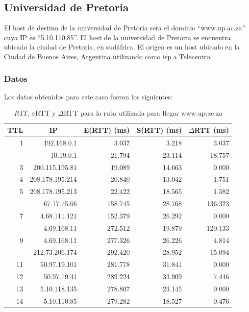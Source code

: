 \subsection{Universidad de Pretoria}
El host de destino de la universidad de Pretoria sera el dominio ``www.up.ac.za'' cuya IP es ``5.10.110.85''. El host de la universidad de Pretoria se encuentra ubicado la ciudad de Pretoria, en sudáfrica. El origen es un host ubicado en la Ciudad de Buenos Aires, Argentina utilizando como isp a Telecentro.

\subsubsection{Datos}

Los datos obtenidos para este caso fueron los siguientes:

\begin{table}[H]
    \begin{center}
        \begin{tabular}{| r | r | r | r | r |}
  \hline
  {\bf TTL} & \multicolumn{1}{|c|}{\bf IP} & {\bf E(RTT) (ms)} & {\bf S(RTT) (ms)} & {\bf $\Delta$RTT (ms)}\\
  \hline 
\hline 1  & 192.168.0.1 &  3.037 & 3.218 & 3.037\\
\rowcolor{blue!25}\hline 2  & 10.19.0.1 & 21.794 & 23.114 & 18.757\\
\hline 3  & 200.115.195.81 & 19.089 & 14.663 & 0.000\\
\hline 4  & 208.178.195.214 & 20.840 & 13.042 & 1.751\\ 
\hline 5  & 208.178.195.213 & 22.422 & 18.565 & 1.582\\ 
\rowcolor{blue!25}\hline 6  & 67.17.75.66 & 158.745 & 28.768 & 136.323\\ 
\hline 7  & 4.68.111.121 &  152.379 & 26.292 & 0.000\\ 
\rowcolor{blue!25}\hline 8  & 4.69.168.11 & 272.512 & 19.879 & 120.133\\ 
\hline 9  & 4.69.168.11 & 277.326 & 26.226 & 4.814\\ 
\rowcolor{blue!25}\hline 10  & 212.73.206.174 & 292.420 & 28.952 & 15.094\\ 
\hline 11  & 50.97.19.101 & 281.778 & 31.841 & 0.000\\ 
\hline 12  & 50.97.19.41 & 289.224 & 33.909 & 7.446\\ 
\hline 13  & 5.10.118.135 & 278.807 & 23.145 & 0.000\\ 
\hline 14  & 5.10.110.85 & 279.282 & 18.527 & 0.476\\ 
\hline
        \end{tabular}
        \caption{$\overline{RTT}$, $\sigma$RTT y $\Delta$RTT para la ruta utilizada para llegar www.up.ac.za}
        \label{table:pretoria} 
    \end{center}
\end{table}


